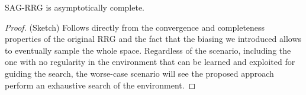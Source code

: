 \begin{theorem}
SAG-RRG is asymptotically complete.
\end{theorem}
\begin{proof}
(Sketch) Follows directly from the convergence and completeness properties of the original RRG \cite{karaman2011sampling} and the fact that the biasing we introduced allows to eventually sample the whole space. Regardless of the scenario, including the one with no regularity in the environment that can be learned and exploited for guiding the search, the worse-case scenario will see the proposed approach perform an exhaustive search of the environment.%
\end{proof}



